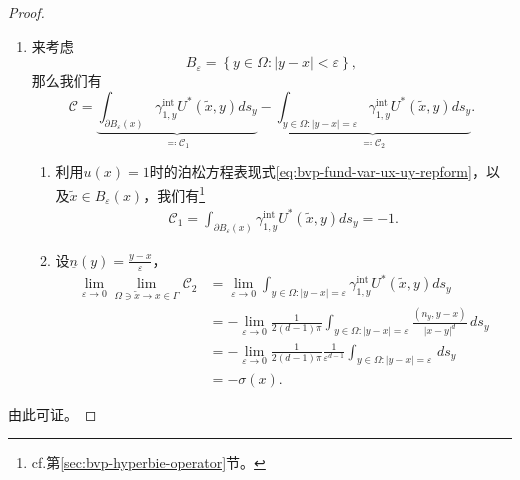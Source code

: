 \begin{proof}
\begin{enumerate}
  \item 来考虑
  \begin{equation*}
    B_{\varepsilon} = \left\{ y \in \Omega: \left| y - x \right| < \varepsilon \right\},
  \end{equation*}
  那么我们有
  \begin{equation*}
    \mathcal{C} =
    \underbrace{
    \int_{\partial B_{\varepsilon}(x)}
    \gamma_{1,y}^{\text{int}} U^{*}(\widetilde{x}, y) d s_y
    }_{\eqqcolon \mathcal{C}_1}
    - \underbrace{
    \int_{y \in \Omega: \left| y - x \right| = \varepsilon}
    \gamma_{1,y}^{\text{int}} U^{*}(\widetilde{x}, y)
    d s_y
    }_{\eqqcolon \mathcal{C}_2}.
  \end{equation*}
  \begin{enumerate}
    \item 利用$u(x)=1$时的泊松方程表现式\eqref{eq:bvp-fund-var-ux-uy-repform}，以及$\widetilde{x} \in B_{\varepsilon}(x)$，我们有\footnote{cf.第\ref{sec:bvp-hyperbie-operator}节。}
    \begin{equation*}
      \begin{split}
        \mathcal{C}_1 = \int_{\partial B_{\varepsilon}(x)}
        \gamma_{1,y}^{\text{int}} U^{*}(\widetilde{x}, y) d s_y = -1.
      \end{split}
    \end{equation*}
    \item 设$\underline{n}(y) = \frac{y-x}{\varepsilon}$，
    \begin{equation*}
      \begin{split}
        \lim_{\varepsilon \rightarrow 0} \lim_{\Omega \ni \widetilde x \rightarrow x \in \Gamma} \mathcal{C}_2
        & = \lim_{\varepsilon \rightarrow 0}
        \int_{y \in \Omega: \left| y - x \right| = \varepsilon}
        \gamma_{1,y}^{\text{int}} U^{*}(\widetilde{x}, y)
        d s_y \\
        & = - \lim_{\varepsilon \rightarrow 0}
        \frac{1}{2(d-1) \pi}
        \int_{y \in \Omega: \left| y - x \right| = \varepsilon}
        \frac{
        \left(n_y, y-x \right)
        }{
        \left| x - y \right|^{d}
        }
        \, d s_y \\
        & = - \lim_{\varepsilon \rightarrow 0}
        \frac{1}{2(d-1) \pi}
        \frac{1}{\varepsilon^{d-1}}
        \int_{y \in \Omega: \left| y - x \right| = \varepsilon}
        \, d s_y \\
        &= - \sigma(x).
      \end{split}
    \end{equation*}
  \end{enumerate}
\end{enumerate}
由此可证。
\end{proof}

